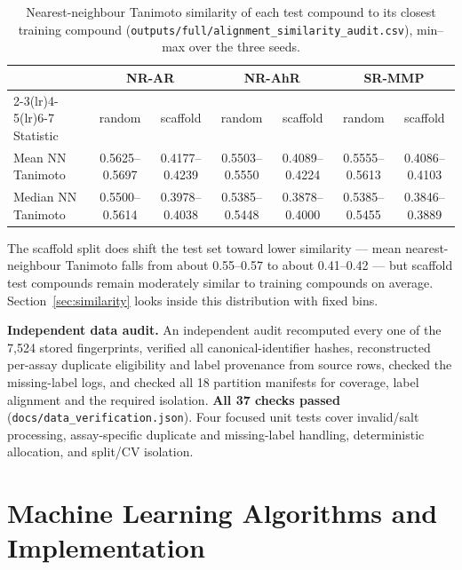 \documentclass[10pt,letterpaper]{article}
\begin{document}
\begin{table}[!htbp]
\centering
\footnotesize
\caption{Nearest-neighbour Tanimoto similarity of each test compound to its closest training
compound (\texttt{outputs/full/alignment\_similarity\_audit.csv}), min--max over the three seeds.}
\label{tab:tanimoto}
\begin{tabular}{@{}lcccccc@{}}
\toprule
 & \multicolumn{2}{c}{NR-AR} & \multicolumn{2}{c}{NR-AhR} & \multicolumn{2}{c}{SR-MMP} \\
\cmidrule(lr){2-3}\cmidrule(lr){4-5}\cmidrule(lr){6-7}
Statistic & random & scaffold & random & scaffold & random & scaffold \\
\midrule
Mean NN Tanimoto   & 0.5625--0.5697 & 0.4177--0.4239 & 0.5503--0.5550 & 0.4089--0.4224 & 0.5555--0.5613 & 0.4086--0.4103 \\
Median NN Tanimoto & 0.5500--0.5614 & 0.3978--0.4038 & 0.5385--0.5448 & 0.3878--0.4000 & 0.5385--0.5455 & 0.3846--0.3889 \\
\bottomrule
\end{tabular}
\end{table}

The scaffold split does shift the test set toward lower similarity --- mean nearest-neighbour
Tanimoto falls from about 0.55--0.57 to about 0.41--0.42 --- but scaffold test compounds remain
moderately similar to training compounds on average. Section~\ref{sec:similarity} looks inside this
distribution with fixed bins.

\textbf{Independent data audit.} An independent audit recomputed every one of the 7{,}524 stored
fingerprints, verified all canonical-identifier hashes, reconstructed per-assay duplicate
eligibility and label provenance from source rows, checked the missing-label logs, and checked all
18 partition manifests for coverage, label alignment and the required isolation. \textbf{All 37
checks passed} (\texttt{docs/data\_verification.json}). Four focused unit tests cover invalid/salt
processing, assay-specific duplicate and missing-label handling, deterministic allocation, and
split/CV isolation.

\section{Machine Learning Algorithms and Implementation}
\end{document}
